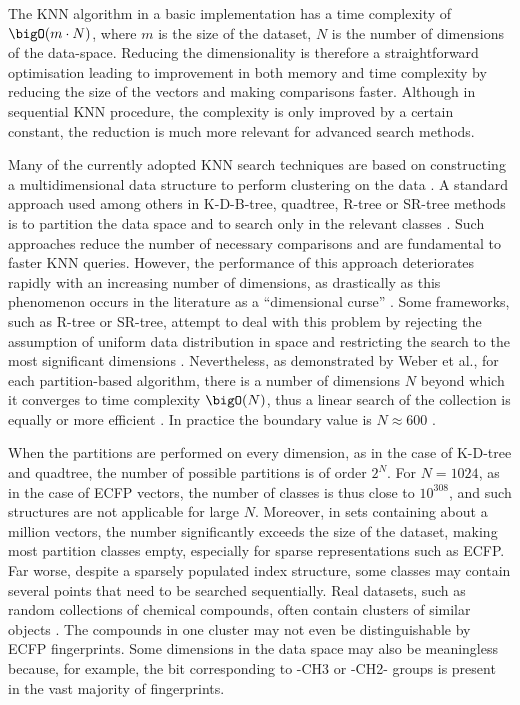 The KNN algorithm in a basic implementation has a time complexity of \( \bigO(m \cdot N) \), where \( m \) is the size of the dataset, \( N \) is the number of dimensions of the data-space. Reducing the dimensionality is therefore a straightforward optimisation leading to improvement in both memory and time complexity by reducing the size of the vectors and making comparisons faster. Although in sequential KNN procedure, the complexity is only improved by a certain constant, the reduction is much more relevant for advanced search methods.

Many of the currently adopted KNN search techniques are based on constructing a multidimensional data structure to perform clustering on the data \cite{weber1998knn}. A standard approach used among others in K-D-B-tree, quadtree, R-tree or SR-tree methods is to partition the data space and to search only in the relevant classes \cite{weber1998knn}. Such approaches reduce the number of necessary comparisons and are fundamental to faster KNN queries. However, the performance of this approach deteriorates rapidly with an increasing number of dimensions, as drastically as this phenomenon occurs in the literature as a ``dimensional curse'' \cite{weber1998knn}. Some frameworks, such as R-tree or SR-tree, attempt to deal with this problem by rejecting the assumption of uniform data distribution in space and restricting the search to the most significant dimensions \cite{katayama1997srtree}. Nevertheless, as demonstrated by Weber et al., for each partition-based algorithm, there is a number of dimensions \( N \) beyond which it converges to time complexity \( \bigO(N) \), thus a linear search of the collection is equally or more efficient \cite{weber1998knn}. In practice the boundary value is \( N \approx 600 \) \cite{weber1998knn}.

When the partitions are performed on every dimension, as in the case of K-D-tree and quadtree, the number of possible partitions is of order \( 2^N \). For \( N = 1024 \), as in the case of ECFP vectors, the number of classes is thus close to \( 10^{308} \), and such structures are not applicable for large \( N \). Moreover, in sets containing about a million vectors, the number significantly exceeds the size of the dataset, making most partition classes empty, especially for sparse representations such as ECFP. Far worse, despite a sparsely populated index structure, some classes may contain several points that need to be searched sequentially. Real datasets, such as random collections of chemical compounds, often contain clusters of similar objects \cite{berchtold2002xtree}. The compounds in one cluster may not even be distinguishable by ECFP fingerprints. Some dimensions in the data space may also be meaningless because, for example, the bit corresponding to -CH3 or -CH2- groups is present in the vast majority of fingerprints.

